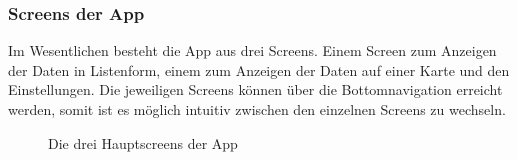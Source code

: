 \subsubsection{Screens der App}\label{screens der app}
Im Wesentlichen besteht die App aus drei Screens. Einem Screen zum Anzeigen der Daten in Listenform, 
einem zum Anzeigen der Daten auf einer Karte und den Einstellungen. 
Die jeweiligen Screens können über die Bottomnavigation erreicht werden, somit ist es möglich intuitiv zwischen den einzelnen 
Screens zu wechseln.
\begin{figure}[H]
    \centering
    \caption{Die drei Hauptscreens der App}
  \end{figure}

